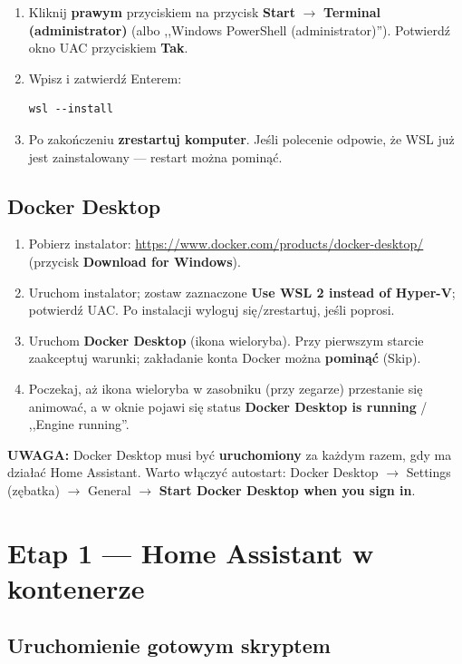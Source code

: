 \documentclass[11pt,a4paper]{article}
\newcommand{\uwaga}[1]{\par\medskip\noindent\textcolor{warnred}{\textbf{UWAGA:}} #1\par\medskip}
\begin{document}
\begin{enumerate}
\item Kliknij \textbf{prawym} przyciskiem na przycisk \textbf{Start} $\to$ \textbf{Terminal (administrator)} (albo ,,Windows PowerShell (administrator)''). Potwierdź okno UAC przyciskiem \textbf{Tak}.
\item Wpisz i zatwierdź Enterem:
\begin{lstlisting}
wsl --install
\end{lstlisting}
\item Po zakończeniu \textbf{zrestartuj komputer}. Jeśli polecenie odpowie, że WSL już jest zainstalowany --- restart można pominąć.
\end{enumerate}

\subsection{Docker Desktop}

\begin{enumerate}
\item Pobierz instalator: \url{https://www.docker.com/products/docker-desktop/} (przycisk \textbf{Download for Windows}).
\item Uruchom instalator; zostaw zaznaczone \textbf{Use WSL 2 instead of Hyper-V}; potwierdź UAC. Po instalacji wyloguj się/zrestartuj, jeśli poprosi.
\item Uruchom \textbf{Docker Desktop} (ikona wieloryba). Przy pierwszym starcie zaakceptuj warunki; zakładanie konta Docker można \textbf{pominąć} (Skip).
\item Poczekaj, aż ikona wieloryba w zasobniku (przy zegarze) przestanie się animować, a w oknie pojawi się status \textbf{Docker Desktop is running} / ,,Engine running''.
\end{enumerate}

\uwaga{Docker Desktop musi być \textbf{uruchomiony} za każdym razem, gdy ma działać Home Assistant. Warto włączyć autostart: Docker Desktop $\to$ Settings (zębatka) $\to$ General $\to$ \textbf{Start Docker Desktop when you sign in}.}

\section{Etap 1 --- Home Assistant w kontenerze}
\label{sec:etap1}

\subsection{Uruchomienie gotowym skryptem}
\end{document}
